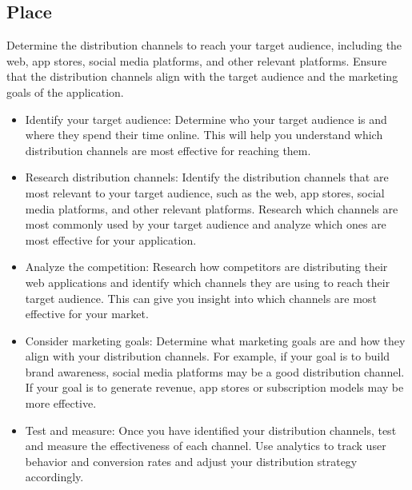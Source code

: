 \documentclass[12pt,a4paper]{article}
\begin{document}
\subsection{Place}
Determine the distribution channels to reach your target audience, including the web, app stores, social media platforms, and other relevant platforms. Ensure that the distribution channels align with the target audience and the marketing goals of the application.
\begin{itemize}
    \item Identify your target audience: Determine who your target audience is and where they spend their time online. This will help you understand which distribution channels are most effective for reaching them.
    \item Research distribution channels: Identify the distribution channels that are most relevant to your target audience, such as the web, app stores, social media platforms, and other relevant platforms. Research which channels are most commonly used by your target audience and analyze which ones are most effective for your application.
    \item Analyze the competition: Research how competitors are distributing their web applications and identify which channels they are using to reach their target audience. This can give you insight into which channels are most effective for your market.
    \item Consider marketing goals: Determine what marketing goals are and how they align with your distribution channels. For example, if your goal is to build brand awareness, social media platforms may be a good distribution channel. If your goal is to generate revenue, app stores or subscription models may be more effective.
    \item Test and measure: Once you have identified your distribution channels, test and measure the effectiveness of each channel. Use analytics to track user behavior and conversion rates and adjust your distribution strategy accordingly.
\end{itemize}
\end{document}
